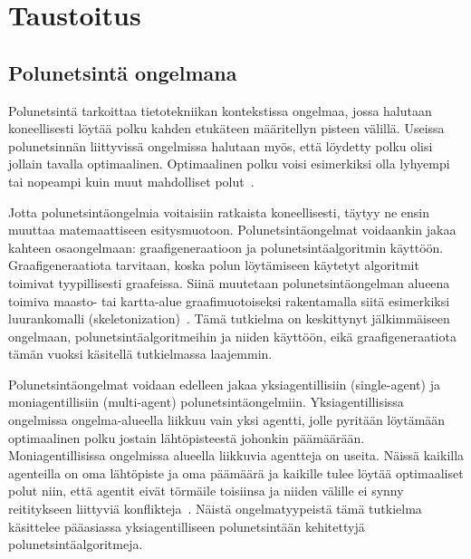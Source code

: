 \chapter{Taustoitus} \label{Taustoitus}

\section{Polunetsintä ongelmana}\label{pOngelmana}
Polunetsintä tarkoittaa tietotekniikan kontekstissa ongelmaa, jossa halutaan 
koneellisesti löytää polku kahden etukäteen määritellyn pisteen välillä. 
Useissa polunetsinnän liittyvissä ongelmissa halutaan myös, että löydetty 
polku olisi jollain tavalla optimaalinen. Optimaalinen polku voisi 
esimerkiksi olla lyhyempi tai nopeampi kuin muut mahdolliset 
polut~\cite{MathewAndMalathy}.\par
	Jotta polunetsintäongelmia voitaisiin ratkaista koneellisesti, 
täytyy ne ensin muuttaa matemaattiseen esitysmuotoon. Polunetsintäongelmat 
voidaankin jakaa kahteen osaongelmaan: graafigeneraatioon ja 
polunetsintäalgoritmin käyttöön. Graafigene\-raatiota tarvitaan, koska polun 
löytämiseen käytetyt algoritmit toimivat tyypillisesti graafeissa. Siinä 
muutetaan polunetsintäongelman alueena toimiva maasto- tai kartta-alue 
graafimuotoiseksi rakentamalla siitä esimerkiksi luurankomalli 
(skeletonization)~\cite{ACMHindawi}. Tämä tutkielma on keskittynyt 
jälkimmäiseen ongelmaan, polunetsintäalgoritmeihin ja niiden käyttöön, eikä 
graafigeneraatiota tämän vuoksi käsitellä tutkielmassa laajemmin. \par
	Polunetsintäongelmat voidaan edelleen jakaa yksiagentillisiin 
(single-agent) ja moniagentillisiin (multi-agent) polunetsintäongelmiin. 
Yksiagentillisissa ongelmissa ongelma-alueella liikkuu vain yksi agentti, 
jolle pyritään löytämään optimaalinen polku jostain lähtöpisteestä johonkin 
päämäärään. Moniagentillisissa ongelmissa alueella liikkuvia agentteja on 
useita. Näissä kaikilla agenteilla on oma lähtöpiste ja oma päämäärä ja 
kaikille tulee löytää optimaaliset polut niin, että agentit eivät törmäile 
toisiinsa ja niiden välille ei synny reititykseen liittyviä 
konflikteja~\cite{arXivMAPF}. Näistä ongelmatyypeistä tämä tutkielma käsittelee 
pääasiassa yksiagentilliseen polunetsintään kehitettyjä 
polunetsintäalgoritmeja.

